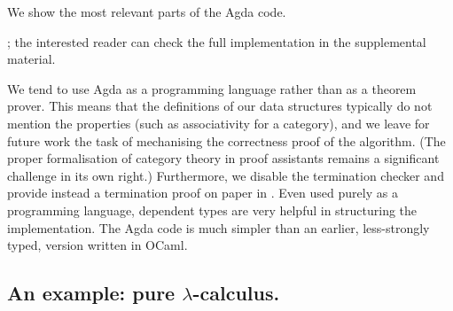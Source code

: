 We show the most relevant parts of the Agda code. \begin{full}; the
interested reader can check the full implementation in the supplemental
material.\end{full} We tend to use Agda as a programming language
rather than as a theorem prover. This means that the definitions of
our data structures typically do not mention the properties (such
as associativity for a category), and we leave for future work the
task of mechanising the correctness proof of the algorithm. (The proper
formalisation of category theory in proof assistants remains a significant
challenge in its own right.) Furthermore, we disable the termination
checker and provide instead a termination proof on paper in .
Even used purely as a programming language, dependent types are very
helpful in structuring the implementation. The Agda code is much simpler
than an earlier, less-strongly typed, version written in OCaml.


\subsection{An example: pure $\lambda$-calculus.}

\label{subsec:example-lambda}

